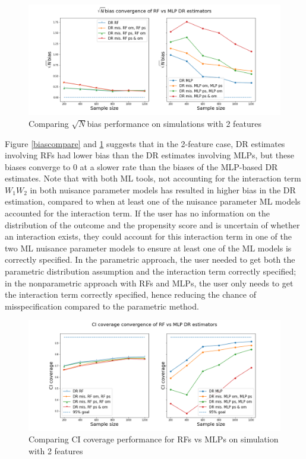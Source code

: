 \documentclass[12pt,twoside]{article}
\begin{document}
\begin{figure}[h!]
    \centering
    \includegraphics[width = 0.9\columnwidth]{figures/sqrtncompare.png}
    \caption{Comparing $\sqrt{N}$bias performance on simulations with 2 features}
    \label{sqrtncompare}
\end{figure}

Figure \ref{biascompare} and \ref{sqrtncompare} suggests that in the 2-feature case, DR estimates involving RFs had lower bias than the DR estimates involving MLPs, but these biases converge to 0 at a slower rate than the biases of the MLP-based DR estimates. Note that with both ML tools, not accounting for the interaction term $W_1W_2$ in both nuisance parameter models has resulted in higher bias in the DR estimation, compared to when at least one of the nuisance parameter ML models accounted for the interaction term. If the user has no information on the distribution of the outcome and the propensity score and is uncertain of whether an interaction exists, they could account for this interaction term in one of the two ML nuisance parameter models to ensure at least one of the ML models is correctly specified. In the parametric approach, the user needed to get both the parametric distribution assumption and the interaction term correctly specified; in the nonparametric approach with RFs and MLPs, the user only needs to get the interaction term correctly specified, hence reducing the chance of misspecification compared to the parametric method.

\begin{figure}[h!]
    \centering
    \includegraphics[width = 0.9\columnwidth]{figures/CIcompare.png}
    \caption{Comparing CI coverage performance for RFs vs MLPs on simulation with 2 features}
    \label{CIcompare}
\end{figure}
 
\end{document}
